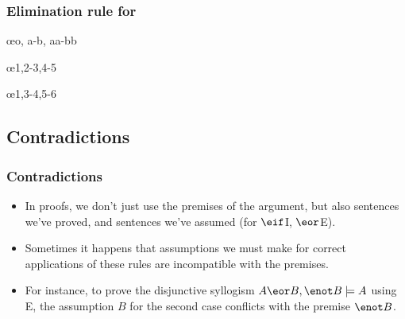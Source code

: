 \begin{frame}
  \frametitle{Elimination rule for \eor}
  \begin{fitchproof}
    \open
    \ellipsesline
    \close
    \open
    \ellipsesline
    \close
     \oe{o, a-b, aa-bb}
  \end{fitchproof}
\end{frame}


\begin{frame}
  \begin{fitchproof}
    \open
    \close
    \open
    \close
    \oe{1,2-3,4-5}
  \end{fitchproof}
\end{frame}

\begin{frame}
  \begin{fitchproof}
    \open
    \close
    \open
    \close
    \oe{1,3-4,5-6}
  \end{fitchproof}
\end{frame}


\newhourlecture
\subsection{Contradictions}

\begin{frame}
  \frametitle{Contradictions}

  \begin{itemize}[<+->]
  \item In proofs, we don't just use the premises of the argument, but also
  sentences we've proved, and sentences we've assumed (for $\eif$I,
  $\eor$E).

  \item Sometimes it happens that assumptions we must make for correct
  applications of these rules are incompatible with the premises.

  \item For instance, to prove the disjunctive syllogism $A \eor B,
  \enot B \models A$ using \eor E, the assumption $B$ for the second
  case conflicts with the premise $\enot B$.
  \end{itemize}
\end{frame}

